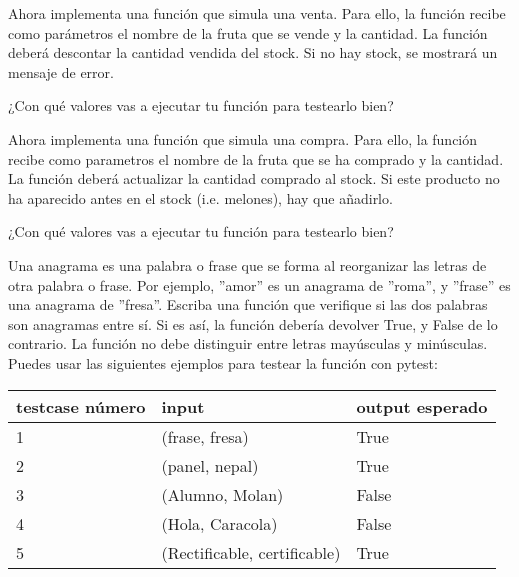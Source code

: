 \begin{exercise}  Ahora implementa una función  que simula una venta.
Para ello, la función recibe como parámetros el nombre de la fruta que se vende y la cantidad. La función deberá descontar la cantidad vendida del stock. Si no hay stock, se mostrará un mensaje de error. 

¿Con qué valores vas a ejecutar tu función para testearlo bien?
\end{exercise} 

\begin{exercise} Ahora implementa una función  que simula una compra.
Para ello, la función recibe como parametros el nombre de la fruta que se ha comprado y la cantidad. La función deberá actualizar la cantidad comprado al stock. 
Si este producto no ha aparecido antes en el stock (i.e. melones), hay que añadirlo.

¿Con qué valores vas a ejecutar tu función para testearlo bien?
\end{exercise} 

\begin{exercise}
Una anagrama es una palabra o frase que se forma al reorganizar las letras de otra palabra o frase. Por ejemplo, ''amor'' es un anagrama de ''roma'', y ''frase'' 
es una anagrama de ''fresa''. Escriba una función  que verifique si las dos palabras son anagramas entre sí. Si es así, la función debería devolver True, y False de lo contrario. La función no debe distinguir entre letras mayúsculas y minúsculas.
Puedes usar las siguientes ejemplos para testear la función con pytest:

\begin{longtable}{|l|l|l|}
\hline
testcase número & input & output esperado   \\ \hline
1  & (frase, fresa)   & True \\ 
2  & (panel, nepal)     & True\\
3 & (Alumno, Molan)     & False \\
4 & (Hola, Caracola)      & False \\
5 & (Rectificable, certificable)  & True \\
\hline
\end{longtable}

\end{exercise} 

